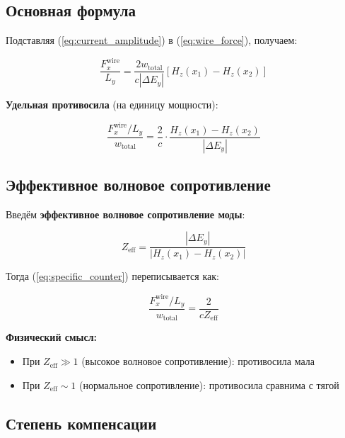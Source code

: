 \documentclass[a4paper,12pt]{article}
\begin{document}
\subsection{Основная формула}

Подставляя (\ref{eq:current_amplitude}) в (\ref{eq:wire_force}), получаем:

\begin{equation}
\frac{F_x^{\text{wire}}}{L_y} = \frac{2 w_{\text{total}}}{c |\Delta E_y|}
\left[ H_z(x_1) - H_z(x_2) \right]
\end{equation}

\textbf{Удельная противосила} (на единицу мощности):

\begin{equation}
\boxed{
\frac{F_x^{\text{wire}}/L_y}{w_{\text{total}}} = \frac{2}{c} \cdot
\frac{H_z(x_1) - H_z(x_2)}{|\Delta E_y|}
}
\label{eq:specific_counter}
\end{equation}

\subsection{Эффективное волновое сопротивление}

Введём \textbf{эффективное волновое сопротивление моды}:

\begin{equation}
\boxed{
Z_{\text{eff}} = \frac{|\Delta E_y|}{|H_z(x_1) - H_z(x_2)|}
}
\label{eq:Z_eff}
\end{equation}

Тогда (\ref{eq:specific_counter}) переписывается как:

\begin{equation}
\frac{F_x^{\text{wire}}/L_y}{w_{\text{total}}} = \frac{2}{c Z_{\text{eff}}}
\label{eq:specific_counter_Z}
\end{equation}

\textbf{Физический смысл:}
\begin{itemize}
    \item При $Z_{\text{eff}} \gg 1$ (высокое волновое сопротивление):
    противосила мала
    \item При $Z_{\text{eff}} \sim 1$ (нормальное сопротивление):
    противосила сравнима с тягой
\end{itemize}

\subsection{Степень компенсации}
\end{document}
